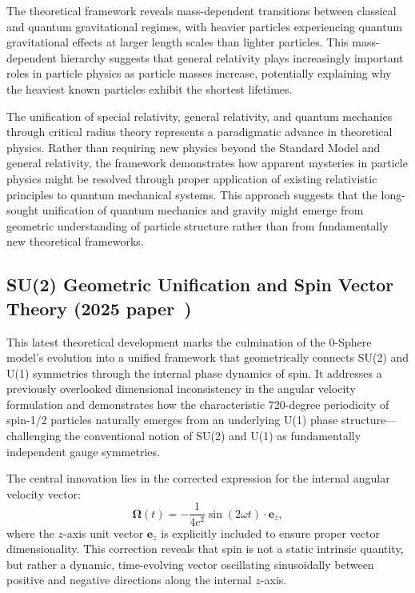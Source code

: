 \documentclass[%
 reprint,
 amsmath,amssymb,
 aps,
]{revtex4-1}
\numberwithin{equation}{section}%
\begin{document}
The theoretical framework reveals mass-dependent transitions between classical and quantum gravitational regimes, with heavier particles experiencing quantum gravitational effects at larger length scales than lighter particles. This mass-dependent hierarchy suggests that general relativity plays increasingly important roles in particle physics as particle masses increase, potentially explaining why the heaviest known particles exhibit the shortest lifetimes.

The unification of special relativity, general relativity, and quantum mechanics through critical radius theory represents a paradigmatic advance in theoretical physics. Rather than requiring new physics beyond the Standard Model and general relativity, the framework demonstrates how apparent mysteries in particle physics might be resolved through proper application of existing relativistic principles to quantum mechanical systems. This approach suggests that the long-sought unification of quantum mechanics and gravity might emerge from geometric understanding of particle structure rather than from fundamentally new theoretical frameworks.

\subsection{SU(2) Geometric Unification and Spin Vector Theory (2025 paper~\cite{hanamura2506.0072})}

This latest theoretical development marks the culmination of the 0-Sphere model’s evolution into a unified framework that geometrically connects SU(2) and U(1) symmetries through the internal phase dynamics of spin. It addresses a previously overlooked dimensional inconsistency in the angular velocity formulation and demonstrates how the characteristic 720-degree periodicity of spin-1/2 particles naturally emerges from an underlying U(1) phase structure—challenging the conventional notion of SU(2) and U(1) as fundamentally independent gauge symmetries.

The central innovation lies in the corrected expression for the internal angular velocity vector:
\begin{equation}
    \boldsymbol{\Omega}(t) = -\frac{1}{4c^2} \sin(2\omega t) \cdot \boldsymbol{e}_z,
\label{eq:angular_velocity_corrected}
\end{equation}
where the $z$-axis unit vector $\boldsymbol{e}_z$ is explicitly included to ensure proper vector dimensionality. This correction reveals that spin is not a static intrinsic quantity, but rather a dynamic, time-evolving vector oscillating sinusoidally between positive and negative directions along the internal $z$-axis.
\end{document}
